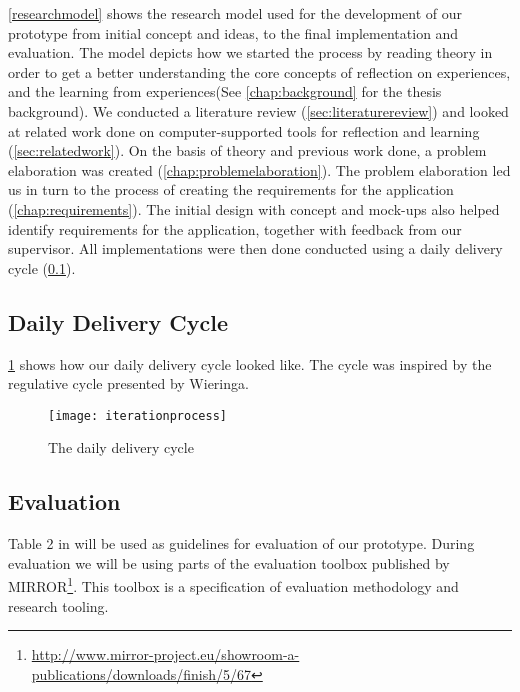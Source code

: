 \ref{researchmodel} shows the research model used for the development of our prototype from initial concept and ideas, to the final implementation and evaluation. The model depicts how we started the process by reading theory in order to get a better understanding the core concepts of reflection on experiences, and the learning from experiences(See \ref{chap:background} for the thesis background). We conducted a literature review (\ref{sec:literaturereview}) and looked at related work done on computer-supported tools for reflection and learning (\ref{sec:relatedwork}). On the basis of theory and previous work done, a problem elaboration was created (\ref{chap:problemelaboration}). The problem elaboration led us in turn to the process of creating the requirements for the application (\ref{chap:requirements}). The initial design with concept and mock-ups also helped identify requirements for the application, together with feedback from our supervisor. All implementations were then done conducted using a daily delivery cycle (\ref{sec:dailydeliverycycle}).

\subsection{Daily Delivery Cycle}
\label{sec:dailydeliverycycle}

\ref{iterationprocess} shows how our daily delivery cycle looked like. The cycle was inspired by the regulative cycle presented by Wieringa\cite{wieringa}. 
\begin{figure}[!htpb]
\label{iterationprocess}
\centering
	\texttt{[image: iterationprocess]}
\caption{The daily delivery cycle}
\end{figure}


\subsection{Evaluation}
Table 2 in \cite{Esearch2004} will be used as guidelines for evaluation of our prototype. 
During evaluation we will be using parts of the evaluation toolbox published by MIRROR\footnote{\url{http://www.mirror-project.eu/showroom-a-publications/downloads/finish/5/67}}. This toolbox is a specification of evaluation methodology and research tooling. 

